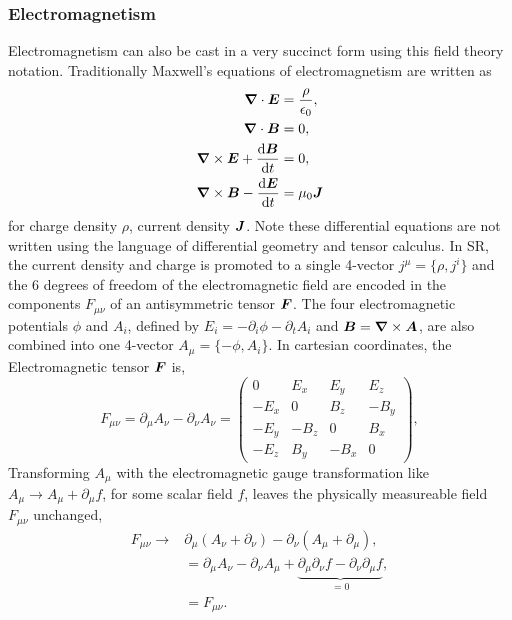 \subsubsection{Electromagnetism}
Electromagnetism can also be cast in a very succinct form using this field theory notation. Traditionally Maxwell's equations of electromagnetism are written as
\begin{align}
\boldsymbol{\nabla} \cdot \boldsymbol{E} &= \frac{\rho}{\epsilon_0} ,\label{intro:eq:max1}\\
\boldsymbol{\nabla} \cdot \boldsymbol{B} &= 0 ,\label{intro:eq:max2}\\
\boldsymbol{\nabla} \times \boldsymbol{E}  + \frac{\dd \boldsymbol{B}}{\dd t} &=0,\label{intro:eq:max3}\\
\boldsymbol{\nabla} \times \boldsymbol{B} -\frac{\dd \boldsymbol{E}}{\dd t} &= \mu_0 \boldsymbol{J}\label{intro:eq:max4}
\end{align}
for charge density $\rho$, current density $\boldsymbol{J}$. Note these differential equations are not written using the language of differential geometry and tensor calculus. In SR, the current density and charge is promoted to a single 4-vector $j^\mu = \{\rho,j^i\}$ and the 6 degrees of freedom of the electromagnetic field are encoded in the components $F_{\mu\nu}$ of an antisymmetric tensor $\boldsymbol{F}$. The four electromagnetic potentials $\phi$ and $A_i$, defined by $E_i = -\partial_i \phi - \partial_t A_i$ and $\boldsymbol{B} = \boldsymbol{\nabla}\times \boldsymbol{A}$, are also combined into one 4-vector $A_\mu = \{-\phi,A_i\}$. In cartesian coordinates, the Electromagnetic tensor $\boldsymbol{F}$ is,
\begin{equation}
F_{\mu\nu} = \partial_\mu A_\nu - \partial_\nu A_\nu = \begin{pmatrix} 0 & E_x & E_y & E_z \\  -E_x & 0 & B_z & -B_y \\  -E_y & -B_z & 0 & B_x \\  -E_z & B_y & -B_x & 0 \end{pmatrix},
\end{equation}
Transforming $A_\mu$ with the electromagnetic gauge transformation like $A_\mu \rightarrow A_\mu + \partial_\mu f$, for some scalar field $f$, leaves the physically measureable field $F_{\mu\nu}$ unchanged,
\begin{align}
F_{\mu\nu} \rightarrow &\partial_{\mu} (A_\nu + \partial_\nu) -  \partial_{\nu} (A_\mu + \partial_\mu) ,\\
&= \partial_{\mu} A_\nu - \partial_{\nu} A_\mu + \underbrace{\partial_\mu\partial_\nu f - \partial_\nu \partial_\mu f}_{=0} , \\
&= F_{\mu\nu}.
\end{align}

